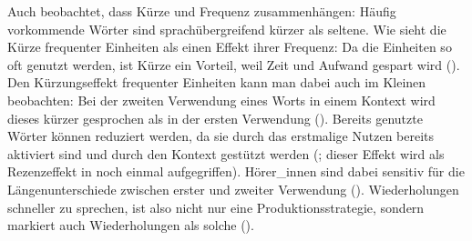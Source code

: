  

Auch \textcite[20--29]{Zipf.1968} beobachtet, dass Kürze und Frequenz zusammenhängen: Häufig vorkommende Wörter sind sprachübergreifend kürzer als seltene. Wie \textcite{Bybee.1997} sieht \textcite[30]{Zipf.1968} die Kürze frequenter Einheiten als einen Effekt ihrer Frequenz: Da die Einheiten so oft genutzt werden, ist Kürze ein Vorteil, weil Zeit und Aufwand gespart wird (\cite[39]{FenkOczlon.1990}). Den Kürzungseffekt frequenter Einheiten kann man dabei auch im Kleinen beobachten: Bei der zweiten Verwendung eines Worts in einem Kontext wird dieses kürzer gesprochen als in der ersten Verwendung (\cite{Fowler.1987}). Bereits genutzte Wörter können reduziert werden, da sie durch das erstmalige Nutzen bereits aktiviert sind und durch den Kontext gestützt werden (\cite[489]{Fowler.1987}; dieser Effekt wird als Rezenzeffekt in  noch einmal aufgegriffen). Hörer\_innen sind dabei sensitiv für die Längenunterschiede zwischen erster und zweiter Verwendung (\cite[501]{Fowler.1987}). Wiederholungen schneller zu sprechen, ist also nicht nur eine Produktionsstrategie, sondern markiert auch Wiederholungen als solche (\cite[11--12]{Bybee.2001}).




